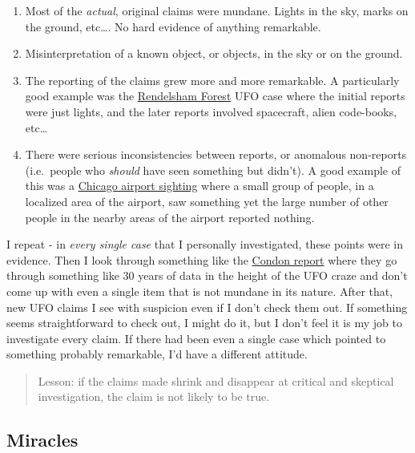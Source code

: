 \documentclass{tufte-book}
\begin{document}
\begin{enumerate}
\def\labelenumi{\arabic{enumi}.}
\itemsep1pt\parskip0pt
\item
  Most of the \emph{actual}, original claims were mundane. Lights in the
  sky, marks on the ground, etc\ldots{}. No hard evidence of anything
  remarkable.
\item
  Misinterpretation of a known object, or objects, in the sky or on the
  ground.
\item
  The reporting of the claims grew more and more remarkable. A
  particularly good example was the
  \href{http://en.wikipedia.org/wiki/Rendlesham_Forest_incident}{Rendelsham
  Forest} UFO case where the initial reports were just lights, and the
  later reports involved spacecraft, alien code-books, etc\ldots{}
\item
  There were serious inconsistencies between reports, or anomalous
  non-reports (i.e.~people who \emph{should} have seen something but
  didn't). A good example of this was a
  \href{http://en.wikipedia.org/wiki/2006_O'Hare_International_Airport_UFO_sighting}{Chicago
  airport sighting} where a small group of people, in a localized area
  of the airport, saw something yet the large number of other people in
  the nearby areas of the airport reported nothing.
\end{enumerate}

I repeat - in \emph{every single case} that I personally investigated,
these points were in evidence. Then I look through something like the
\href{http://files.ncas.org/condon/text/contents.htm}{Condon report}
where they go through something like 30 years of data in the height of
the UFO craze and don't come up with even a single item that is not
mundane in its nature. After that, new UFO claims I see with suspicion
even if I don't check them out. If something seems straightforward to
check out, I might do it, but I don't feel it is my job to investigate
every claim. If there had been even a single case which pointed to
something probably remarkable, I'd have a different attitude.

\begin{quote}
Lesson: if the claims made shrink and disappear at critical and
skeptical investigation, the claim is not likely to be true.
\end{quote}

\subsection{Miracles}\label{pandoc-miracles}
\end{document}

